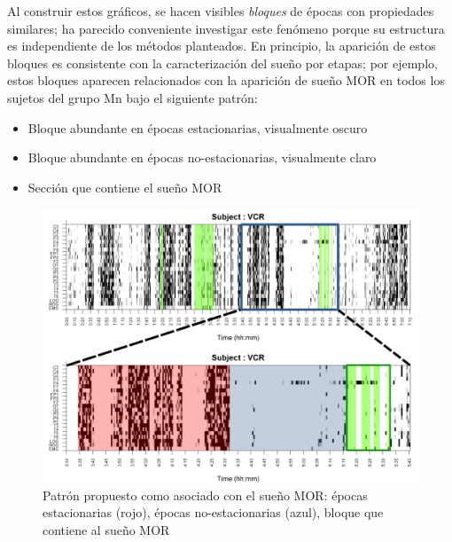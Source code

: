 
Al construir estos gráficos, se hacen visibles \textit{bloques} de épocas con propiedades 
similares; ha parecido conveniente investigar este fenómeno porque su estructura es independiente 
de los métodos planteados. En principio, la aparición de estos bloques es consistente con la
caracterización del sueño por etapas; por ejemplo,
estos bloques aparecen relacionados con la aparición de sueño MOR en todos los 
sujetos del grupo Mn bajo el siguiente patrón:
\begin{itemize}
\item Bloque abundante en épocas estacionarias, visualmente oscuro
\item Bloque abundante en épocas no-estacionarias, visualmente claro
\item Sección que contiene el sueño MOR
\end{itemize}

\begin{figure}
\includegraphics[width=\textwidth]
{./img_ejemplos/zoom_VCR.pdf}
\caption[Patrón propuesto como asociado con el sueño MOR]
{Patrón propuesto como asociado con el sueño MOR: épocas estacionarias 
(rojo), épocas no-estacionarias (azul), bloque que contiene al sueño MOR}
\label{patroncito}
\end{figure}

